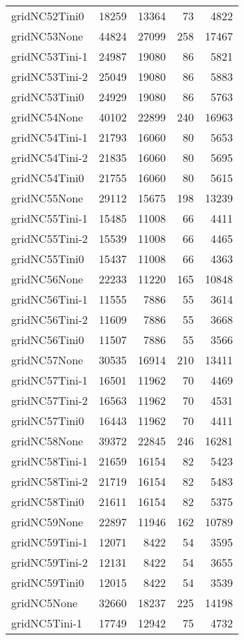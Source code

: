 \begin{longtable}{lrrrr}
gridNC52Tini0 & 18259 & 13364 & 73 & 4822 \\
gridNC53None & 44824 & 27099 & 258 & 17467 \\
gridNC53Tini-1 & 24987 & 19080 & 86 & 5821 \\
gridNC53Tini-2 & 25049 & 19080 & 86 & 5883 \\
gridNC53Tini0 & 24929 & 19080 & 86 & 5763 \\
gridNC54None & 40102 & 22899 & 240 & 16963 \\
gridNC54Tini-1 & 21793 & 16060 & 80 & 5653 \\
gridNC54Tini-2 & 21835 & 16060 & 80 & 5695 \\
gridNC54Tini0 & 21755 & 16060 & 80 & 5615 \\
gridNC55None & 29112 & 15675 & 198 & 13239 \\
gridNC55Tini-1 & 15485 & 11008 & 66 & 4411 \\
gridNC55Tini-2 & 15539 & 11008 & 66 & 4465 \\
gridNC55Tini0 & 15437 & 11008 & 66 & 4363 \\
gridNC56None & 22233 & 11220 & 165 & 10848 \\
gridNC56Tini-1 & 11555 & 7886 & 55 & 3614 \\
gridNC56Tini-2 & 11609 & 7886 & 55 & 3668 \\
gridNC56Tini0 & 11507 & 7886 & 55 & 3566 \\
gridNC57None & 30535 & 16914 & 210 & 13411 \\
gridNC57Tini-1 & 16501 & 11962 & 70 & 4469 \\
gridNC57Tini-2 & 16563 & 11962 & 70 & 4531 \\
gridNC57Tini0 & 16443 & 11962 & 70 & 4411 \\
gridNC58None & 39372 & 22845 & 246 & 16281 \\
gridNC58Tini-1 & 21659 & 16154 & 82 & 5423 \\
gridNC58Tini-2 & 21719 & 16154 & 82 & 5483 \\
gridNC58Tini0 & 21611 & 16154 & 82 & 5375 \\
gridNC59None & 22897 & 11946 & 162 & 10789 \\
gridNC59Tini-1 & 12071 & 8422 & 54 & 3595 \\
gridNC59Tini-2 & 12131 & 8422 & 54 & 3655 \\
gridNC59Tini0 & 12015 & 8422 & 54 & 3539 \\
gridNC5None & 32660 & 18237 & 225 & 14198 \\
gridNC5Tini-1 & 17749 & 12942 & 75 & 4732 \\

\end{longtable}
